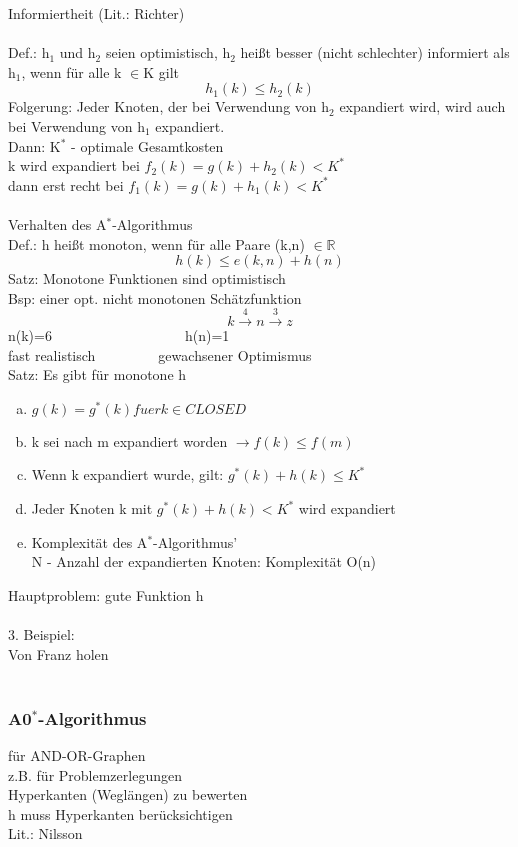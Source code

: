 \documentclass[a4paper,14pt]{article}
\begin{document}
Informiertheit (Lit.: Richter)\\
\\
Def.: h$_1$ und h$_2$ seien optimistisch, h$_2$ heißt besser (nicht schlechter) informiert als h$_1$, wenn für alle k $\in$K gilt
$$h_1(k)\leq h_2(k)$$
Folgerung: Jeder Knoten, der bei Verwendung von h$_2$ expandiert wird, wird auch bei Verwendung von h$_1$ expandiert.\\
Dann: K$^*$ - optimale Gesamtkosten\\
k wird expandiert bei $f_2(k)=g(k)+h_2(k)<K^*$\\
dann erst recht bei $f_1(k)=g(k)+h_1(k)<K^*$\\
\\
Verhalten des A$^*$-Algorithmus\\
Def.: h heißt monoton, wenn für alle Paare (k,n) $\in\mathbb{R}$\\
$$h(k)\leq e(k,n)+h(n)$$
Satz: Monotone Funktionen sind optimistisch\\
Bsp: einer opt. nicht monotonen Schätzfunktion
$$k\xrightarrow{4}n\xrightarrow{3}z$$
n(k)=6~~~~~~~~~~~~~~~~~~~h(n)=1\\
fast realistisch~~~~~~~~~gewachsener Optimismus\\
Satz: Es gibt für monotone h\\
\begin{enumerate}[(a)]
 \item $g(k)=g^*(k) fuer k\in CLOSED$
 \item k sei nach m expandiert worden $\rightarrow f(k)\leq f(m)$
 \item Wenn k expandiert wurde, gilt: $g^*(k)+h(k)\leq K^*$
 \item Jeder Knoten k mit $g^*(k)+h(k)<K^*$ wird expandiert
 \item Komplexität des A$^*$-Algorithmus'\\
	N - Anzahl der expandierten Knoten: Komplexität O(n)
\end{enumerate}
Hauptproblem: gute Funktion h\\
\\
3. Beispiel:\\
Von Franz holen
\\
\\
\subsubsection{A0$^*$-Algorithmus}

für AND-OR-Graphen\\
z.B. für Problemzerlegungen\\
Hyperkanten (Weglängen) zu bewerten\\
h muss Hyperkanten berücksichtigen\\
Lit.: Nilsson
\end{document}
